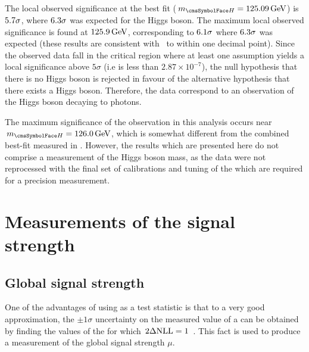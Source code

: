 The local observed significance at the \RunI best fit ($\mH=125.09\GeV$) is $5.7\sigma$, where $6.3\sigma$ was expected for the \SM Higgs boson. The maximum local observed significance is found at $125.9\,\text{Ge\hspace{-.08em}V}$, corresponding to $6.1\sigma$ where $6.3\sigma$ was expected (these results are consistent with~\cite{CMS-PAS-HIG-16-020} to within one decimal point). %
Since the observed data fall in the critical region where at least one \mH assumption yields a local significance above $5\sigma$ (i.e \pvalue is less than $2.87 \times 10^{-7}$), the null hypothesis that there is no Higgs boson is rejected in favour of the alternative hypothesis that there exists a Higgs boson. Therefore, the data correspond to an observation of the Higgs boson decaying to photons.

The maximum significance of the observation in this analysis occurs near $\mH=126.0\GeV$, which is somewhat different from the combined best-fit \mH measured in \RunI. %
However, the results which are presented here do not comprise a measurement of the Higgs boson mass, as the data were not reprocessed with the final set of \ECAL calibrations and tuning of the \PhoEnergyBdt which are required for a precision measurement. %

\section{Measurements of the signal strength}
\label{sec:statandresults:sigstrength}
\subsection{Global signal strength}
\label{sec:statandresults:sigstrength_global}

One of the advantages of using \DNLL as a test statistic is that to a very good approximation, the $\pm 1 \sigma$ uncertainty on the measured value of a \POI can be obtained by finding the values of the \POI for which $\,2\Delta\text{NLL}=1$~\cite{Cowan}. %
This fact is used to produce a measurement of the global signal strength $\mu$. 

